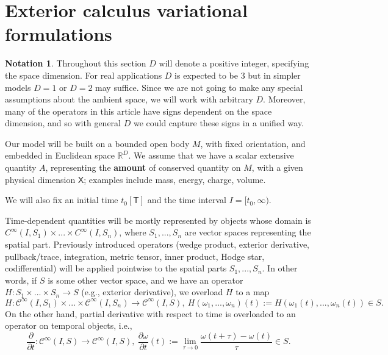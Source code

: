\documentclass{elsarticle}
\theoremstyle{definition}
\newtheorem{notation}[theorem]{Notation}
\newcommand{\R}{\mathbb{R}}
\newcommand{\newterm}[1]{\textbf{#1}}
\newcommand{\amount}{\mathsf{X}}
\renewcommand{\time}{\mathsf{T}}
\begin{document}
\section{Exterior calculus variational formulations}
\label{sec:continuum}

\begin{notation}
  Throughout this section $D$ will denote a positive integer, specifying the space dimension.
  For real applications $D$ is expected to be $3$ but in simpler models $D = 1$ or $D = 2$ may suffice.
  Since we are not going to make any special assumptions about the ambient space, we will work with arbitrary $D$.
  Moreover, many of the operators in this article have signs dependent on the space dimension, and so with general $D$ we could capture these signs in a unified way.

  Our model will be built on a bounded open body $M$, with fixed orientation, and embedded in Euclidean space $\R^D$.
  We assume that we have a scalar extensive quantity $A$, representing the \newterm{amount} of conserved quantity on $M$, with a given physical dimension $\amount$; examples include mass, energy, charge, volume.

  We will also fix an initial time $t_0 [\time]$ and the time interval $I = [t_0, \infty)$.

  Time-dependent quantities will be mostly represented by objects whose domain is
  $C^\infty(I, S_1) \times ... \times C^\infty(I, S_n)$,
  where $S_1, ..., S_n$ are vector spaces representing the spatial part.
  Previously introduced operators (wedge product, exterior derivative, pullback/trace, integration, metric tensor, inner product, Hodge star, codifferential) will be applied pointwise to the spatial parts $S_1, ..., S_n$.
  In other words, if $S$ is some other vector space, and we have an operator
  $H \colon S_1 \times ... \times S_n \to S$
  (e.g., exterior derivative), we overload $H$ to a map
  \begin{equation}
    H \colon \mathcal{C}^\infty(I, S_1) \times ... \times \mathcal{C}^\infty(I, S_n) \to \mathcal{C}^\infty(I, S),\
    H(\omega_1, ..., \omega_n)(t) := H(\omega_1(t), ..., \omega_n(t)) \in S.
  \end{equation}
  On the other hand, partial derivative with respect to time is overloaded to an operator on temporal objects, i.e.,
  \begin{equation}
    \frac{\partial}{\partial t} \colon \mathcal{C}^\infty(I, S) \to \mathcal{C}^\infty(I, S),\
    \frac{\partial \omega}{\partial t}(t)  := \lim_{\tau \to 0} \frac{\omega(t + \tau) - \omega(t)}{\tau} \in S.
  \end{equation}
\end{notation}
\end{document}
